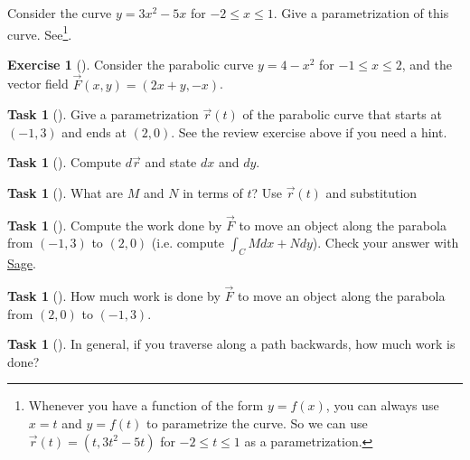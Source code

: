 \documentclass[10pt,]{book}
\theoremstyle{plain}
\theoremstyle{definition}
\theoremstyle{definition}
\theoremstyle{definition}
\theoremstyle{definition}
\newtheorem{exploration}[project]{Exercise}
\newtheorem{task}[project]{Task}
\theoremstyle{definition}
\numberwithin{equation}{section}
\newcommand{\sageworkurl}{http://bmw.byuimath.com/dokuwiki/doku.php?id=work_calculator}
\begin{document}
Consider the curve \(y=3x^2-5x\) for \(-2\leq x\leq 1\). Give a parametrization of this curve. See\footnote{Whenever you have a function of the form \(y=f(x)\), you can always use \(x=t\) and \(y=f(t)\) to parametrize the curve.  So we can use \(\vec r(t) = (t, 3t^2-5t)\) for \(-2\leq t\leq 1\) as a parametrization.\label{fn-18}}.%
\begin{exploration}[]\label{exploration-192}
Consider the parabolic curve \(y=4-x^2\) for \(-1\leq x\leq 2\), and the vector field \(\vec F(x,y) = (2x+y,-x)\).%
\begin{task}[]\label{task-474}
Give a parametrization \(\vec r(t)\) of the parabolic curve that starts at \((-1,3)\) and ends at \((2,0)\).  See the review exercise above if you need a hint.%
\end{task}
\begin{task}[]\label{task-475}
Compute \(d\vec r\) and state \(dx\) and \(dy\).%
\end{task}
\begin{task}[]\label{task-476}
What are \(M\) and \(N\) in terms of \(t\)? Use \(\vec r (t)\) and substitution%
%
\end{task}
\begin{task}[]\label{task-477}
Compute the work done by \(\vec F\) to move an object along the parabola from \((-1,3)\) to \((2,0)\) (i.e. compute \(\int _C Mdx+Ndy\)). Check your answer with \href{\\sageworkurl}{Sage}.%
\end{task}
\begin{task}[]\label{task-478}
How much work is done by \(\vec F\) to move an object along the parabola from \((2,0)\) to \((-1,3)\).%
\end{task}
\begin{task}[]\label{task-479}
In general, if you traverse along a path backwards, how much work is done?%
\end{task}
\end{exploration}
\end{document}
